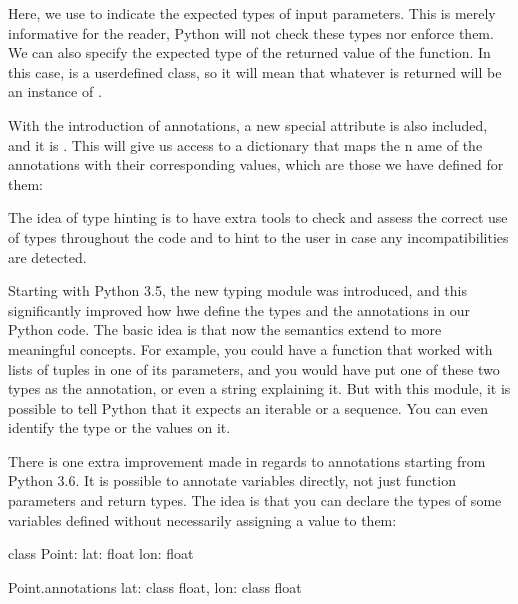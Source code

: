 \documentclass[a4paper,10pt,english]{sphinxmanual}
\begin{document}
Here, we use  to indicate the expected types of input parameters. This is merely informative for the
reader, Python will not check these types nor enforce them. We can also specify the expected type of the
returned value of the function. In this case,  is a user\sphinxhyphen{}defined class, so it will mean that whatever
is returned will be an instance of .

With the introduction of annotations, a new special attribute is also included, and it is .
This will give us access to a dictionary that maps the n ame of the annotations with their corresponding
values, which are those we have defined for them:

\begin{sphinxVerbatim}[commandchars=\\\{\}]
\end{sphinxVerbatim}

The idea of type hinting is to have extra tools to check and assess the correct use of types throughout the
code and to hint to the user in case any incompatibilities are detected.

Starting with Python 3.5, the new typing module was introduced, and this significantly improved how hwe define
the types and the annotations in our Python code. The basic idea is that now the semantics extend to more
meaningful concepts. For example, you could have a function that worked with lists of tuples in one of its
parameters, and you would have put one of these two types as the annotation, or even a string explaining it.
But with this module, it is possible to tell Python that it expects an iterable or a sequence. You can even
identify the type or the values on it.

There is one extra improvement made in regards to annotations starting from Python 3.6. It is possible to
annotate variables directly, not just function parameters and return types. The idea is that you can declare
the types of some variables defined without necessarily assigning a value to them:

\begin{sphinxVerbatim}[commandchars=\\\{\}]
class Point:
    lat: float
    lon: float

\PYGZgt{}\PYGZgt{}\PYGZgt{} Point.\PYGZus{}\PYGZus{}annotations\PYGZus{}\PYGZus{}
\PYGZob{}\PYGZsq{}lat\PYGZsq{}: \PYGZlt{}class \PYGZsq{}float\PYGZsq{}\PYGZgt{}, \PYGZsq{}lon\PYGZsq{}: \PYGZlt{}class \PYGZsq{}float\PYGZsq{}\PYGZgt{}\PYGZcb{}
\end{sphinxVerbatim}
\end{document}
